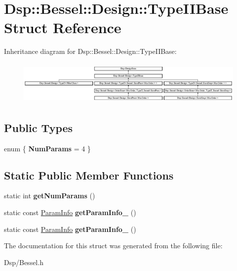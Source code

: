 \hypertarget{structDsp_1_1Bessel_1_1Design_1_1TypeIIBase}{\section{Dsp\-:\-:Bessel\-:\-:Design\-:\-:Type\-I\-I\-Base Struct Reference}
\label{structDsp_1_1Bessel_1_1Design_1_1TypeIIBase}
}
Inheritance diagram for Dsp\-:\-:Bessel\-:\-:Design\-:\-:Type\-I\-I\-Base\-:\begin{figure}[H]
\begin{center}
\leavevmode
\includegraphics[height=2.165507cm]{structDsp_1_1Bessel_1_1Design_1_1TypeIIBase}
\end{center}
\end{figure}
\subsection*{Public Types}
\begin{DoxyCompactItemize}
\item 
enum \{ {\bfseries Num\-Params} =  4
 \}
\end{DoxyCompactItemize}
\subsection*{Static Public Member Functions}
\begin{DoxyCompactItemize}
\item 
\hypertarget{structDsp_1_1Bessel_1_1Design_1_1TypeIIBase_a12938ef9851d400850590e94016a5f48}{static int {\bfseries get\-Num\-Params} ()}\label{structDsp_1_1Bessel_1_1Design_1_1TypeIIBase_a12938ef9851d400850590e94016a5f48}

\item 
\hypertarget{structDsp_1_1Bessel_1_1Design_1_1TypeIIBase_a4c6adefe27dda92c0425225f0c12c242}{static const \hyperlink{classDsp_1_1ParamInfo}{Param\-Info} {\bfseries get\-Param\-Info\-\_} ()}\label{structDsp_1_1Bessel_1_1Design_1_1TypeIIBase_a4c6adefe27dda92c0425225f0c12c242}

\item 
\hypertarget{structDsp_1_1Bessel_1_1Design_1_1TypeIIBase_a19f8bbde67e3789c401a9c2e0741c8aa}{static const \hyperlink{classDsp_1_1ParamInfo}{Param\-Info} {\bfseries get\-Param\-Info\-\_} ()}\label{structDsp_1_1Bessel_1_1Design_1_1TypeIIBase_a19f8bbde67e3789c401a9c2e0741c8aa}

\end{DoxyCompactItemize}


The documentation for this struct was generated from the following file\-:\begin{DoxyCompactItemize}
\item 
Dsp/Bessel.\-h\end{DoxyCompactItemize}
